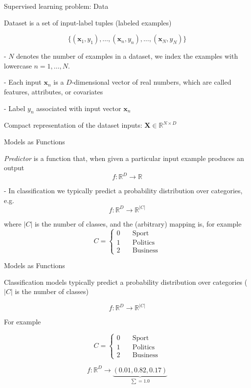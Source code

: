 \documentclass[12pt]{beamer}
\begin{document}
\begin{frame}{Supervised learning problem: Data}

Dataset is a set of input-label tuples (labeled examples)

$$
\{(\mathbf{x}_1, y_1), \dots,  (\mathbf{x}_n, y_n), \dots,  (\mathbf{x}_N, y_N)\}
$$

- $N$ denotes the number of examples in a dataset, we index the examples with lowercase $n = 1, \dots, N$.

\bigskip

- Each input $\mathbf{x}_n$ is a $D$-dimensional vector of real numbers, which are called features, attributes, or covariates

- Label $y_n$ associated with input vector $\mathbf{x}_n$

Compact representation of the dataset inputs: $\mathbf{X} \in \mathbb{R}^{N \times D}$
	
\end{frame}

\begin{frame}{Models as Functions}

\emph{Predictor} is a function that, when given a particular input example produces an output
$$
f: \mathbb{R}^{D} \to \mathbb{R}
$$


- In classification we typically predict a probability distribution over categories, e.g.
$$
f: \mathbb{R}^{D} \to \mathbb{R}^{|C|}
$$

where $|C|$ is the number of classes, and the (arbitrary) mapping is, for example
$$
C =
\begin{cases}
0  & \quad \text{Sport}\\
1  & \quad \text{Politics}\\
2  & \quad \text{Business}
\end{cases}
$$

\end{frame}


\begin{frame}{Models as Functions}
	
Classification models typically predict a probability distribution over categories ($|C|$ is the number of classes)
	
	$$
	f: \mathbb{R}^{D} \to \mathbb{R}^{|C|}
	$$
	
For example
	
$$
C =
\begin{cases}
0  & \quad \text{Sport}\\
1  & \quad \text{Politics}\\
2  & \quad \text{Business}
\end{cases}
$$
	
$$
f: \mathbb{R}^{D} \to \underbrace{(0.01, 0.82, 0.17)}_{\sum = 1.0}
$$

	
\end{frame}
\end{document}
